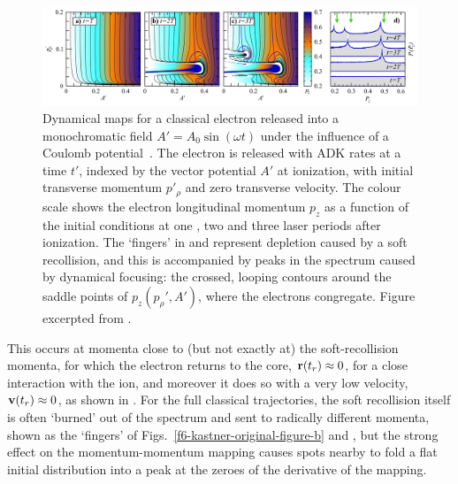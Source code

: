 \begin{figure}[htbp]
  \centering
  \subfigure{\label{f6-kastner-original-figure-a}}
  \subfigure{\label{f6-kastner-original-figure-b}}
  \subfigure{\label{f6-kastner-original-figure-c}}
  \subfigure{\label{f6-kastner-original-figure-d}}
  \includegraphics[width=\textwidth]{6-LES/Figures/figure6I.png}
  \caption[
  Dynamical maps for classical trajectories showing `finger'-like structures and the associated photoelectron bunching, as calculated by A. Kästner~et~al.
  ]{
  Dynamical maps for a classical electron released into a monochromatic field $A'=A_0\sin(\omega t)$ under the influence of a Coulomb potential~\cite{Rost_PRL}. The electron is released with ADK rates at a time $t'$, indexed by the vector potential $A'$ at ionization, with initial transverse momentum $p'_\rho$ and zero transverse velocity. The colour scale shows the electron longitudinal momentum $p_z$ as a function of the initial conditions at one \protect{}, two \protect{} and three \protect{} laser periods after ionization. The `fingers' in \protect{} and \protect{} represent depletion caused by a soft recollision, and this is accompanied by peaks in the spectrum \protect{} caused by dynamical focusing: the crossed, looping contours around the saddle points of $p_z(p_\rho',A')$, where the electrons congregate.
  Figure excerpted from .
  }
\label{f6-kastner-dynamical-focusing}
\end{figure}


This occurs at momenta close to (but not exactly at) the soft-recollision momenta, for which the electron returns to the core, $\vb{r}(t_r) \approx 0$, for a close interaction with the ion, and moreover it does so with a very low velocity, $\vb{v}(t_r)\approx 0$, as shown in . For the full classical trajectories, the soft recollision itself is often `burned' out of the spectrum and sent to radically different momenta, shown as the `fingers' of Figs.~\ref{f6-kastner-original-figure-b} and , but the strong effect on the momentum-momentum mapping causes spots nearby to fold a flat initial distribution into a peak at the zeroes of the derivative of the mapping.


